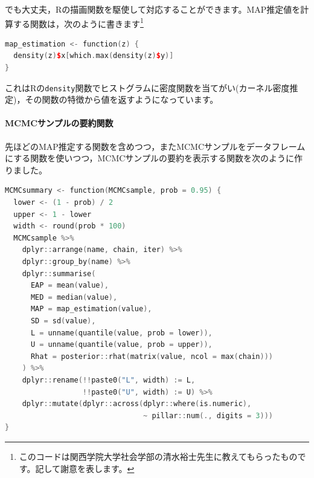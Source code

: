 \documentclass{ltjsbook}
\begin{document}
でも大丈夫，Rの描画関数を駆使して対応することができます。MAP推定値を計算する関数は，次のように書きます\footnote{このコードは関西学院大学社会学部の清水裕士先生に教えてもらったものです。記して謝意を表します。}

\begin{lstlisting}[language=C++,label={code:04_05},caption={MAP推定する関数のコード}]
map_estimation <- function(z) {
  density(z)$x[which.max(density(z)$y)]
}
\end{lstlisting}
これはRの\verb|density|関数でヒストグラムに密度関数を当てがい(カーネル密度推定)，その関数の特徴から値を返すようになっています。

\paragraph{MCMCサンプルの要約関数}
先ほどのMAP推定する関数を含めつつ，またMCMCサンプルをデータフレームにする関数を使いつつ，MCMCサンプルの要約を表示する関数を次のように作りました。
\begin{lstlisting}[language=C++,label={code:04_06},caption={MCMCの要約を報告するコード}]
MCMCsummary <- function(MCMCsample, prob = 0.95) {
  lower <- (1 - prob) / 2
  upper <- 1 - lower
  width <- round(prob * 100)
  MCMCsample %>%
    dplyr::arrange(name, chain, iter) %>%
    dplyr::group_by(name) %>%
    dplyr::summarise(
      EAP = mean(value),
      MED = median(value),
      MAP = map_estimation(value),
      SD = sd(value),
      L = unname(quantile(value, prob = lower)),
      U = unname(quantile(value, prob = upper)),
      Rhat = posterior::rhat(matrix(value, ncol = max(chain)))
    ) %>%
    dplyr::rename(!!paste0("L", width) := L,
                  !!paste0("U", width) := U) %>%
    dplyr::mutate(dplyr::across(dplyr::where(is.numeric),
                                ~ pillar::num(., digits = 3)))
}
\end{lstlisting}
\end{document}
